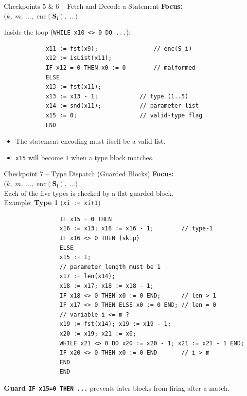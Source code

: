 \documentclass[aspectratio=169]{beamer}
\begin{document}
	\begin{frame}[fragile]{Checkpoints 5 \& 6 – Fetch and Decode a Statement}
		\textbf{Focus:} \(\bigl(k,\; m,\; \ldots,\; \mathbf{\mathrm{enc}(S_i)},\; \ldots\bigr)\)
		
		Inside the loop (\texttt{WHILE x10 <> 0 DO ...}):
		\begin{verbatim}
			x11 := fst(x9);                // enc(S_i)
			x12 := isList(x11);
			IF x12 = 0 THEN x0 := 0        // malformed
			ELSE
			x13 := fst(x11);
			x13 := x13 - 1;            // type (1..5)
			x14 := snd(x11);           // parameter list
			x15 := 0;                  // valid-type flag
			END
		\end{verbatim}
		\begin{itemize}
			\item The statement encoding must itself be a valid list.
			\item \texttt{x15} will become $1$ when a type block matches.
		\end{itemize}
	\end{frame}
	
	\begin{frame}[fragile]{Checkpoint 7 – Type Dispatch (Guarded Blocks)}
		\textbf{Focus:} \(\bigl(k,\; m,\; \ldots,\; \mathbf{\mathrm{enc}(S_i)},\; \ldots\bigr)\) \\
		Each of the five types is checked by a flat guarded block.\\
		Example: \textbf{Type 1} (\texttt{xi := xi+1})
		{\fontsize{8}{9}\selectfont
			\begin{verbatim}
				IF x15 = 0 THEN
				x16 := x13; x16 := x16 - 1;        // type-1
				IF x16 <> 0 THEN (skip)
				ELSE
				x15 := 1;
				// parameter length must be 1
				x17 := len(x14);
				x18 := x17; x18 := x18 - 1;
				IF x18 <> 0 THEN x0 := 0 END;      // len > 1
				IF x17 <> 0 THEN ELSE x0 := 0 END; // len = 0
				// variable i <= m ?
				x19 := fst(x14); x19 := x19 - 1;
				x20 := x19; x21 := x6;
				WHILE x21 <> 0 DO x20 := x20 - 1; x21 := x21 - 1 END;
				IF x20 <> 0 THEN x0 := 0 END       // i > m
				END
				END
		\end{verbatim}}
		\vspace{-6pt}
		{\small \textbf{Guard \texttt{IF x15=0 THEN ...}} prevents later blocks from firing after a match.}
	\end{frame}
	
\end{document}
